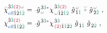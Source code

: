 \begin{subequations} \label{eq:chieff}
\begin{align}
	\textcolor{gray}{\widetilde{\textcolor{black}{\chi}}}^{ \hat{3} \textcolor{PineGreen}{\hat{3}} \textcolor{Maroon}{(2)} \mathcolor{gray}{\omega} }_{ \textcolor{NavyBlue}{\text{eff}} \hat{1} \hat{2} \textcolor{PineGreen}{\hat{1} \hat{2}} } &= \Xint{{}^{}_{\mathcolor{gray}{-}}}{10}{\hat{g}}^{\;\! \hat{3} \textcolor{PineGreen}{\hat{3}} \textcolor{Plum}{*}}_{\;\! \mathcolor{gray}{\omega}} {\chi}^{\;\! \hat{3} \textcolor{PineGreen}{\hat{3}} \textcolor{Maroon}{(2)} }_{\;\! \mathcolor{gray}{\omega} \hat{1} \hat{2} \textcolor{PineGreen}{\hat{1} \hat{2}} } ~ {\hat{g}}^{\;\! \mathcolor{gray}{\omega} }_{\;\! \hat{1} \textcolor{PineGreen}{\hat{1}} } ~\mathcolor{gray}{\widetilde *}~ {\hat{g}}^{\;\! \mathcolor{gray}{\omega} }_{\;\! \hat{2} \textcolor{PineGreen}{\hat{2}} } ~, \label{eq:chieff-spectrum} \\
	{\chi}^{\hat{3} \textcolor{PineGreen}{\hat{3}} \textcolor{Maroon}{(2)} }_{\textcolor{NavyBlue}{\text{eff}} \hat{1} \textcolor{PineGreen}{\hat{1}} \hat{2} \textcolor{PineGreen}{\hat{2}} } &= \Xint{{}^{}_{\mathcolor{gray}{-}}}{10}{\hat{g}}^{\;\! \hat{3} \textcolor{PineGreen}{\hat{3}} \textcolor{Plum}{*}}_{\;\! } {\chi}^{\;\! \hat{3} \textcolor{PineGreen}{\hat{3}} }_{\;\! \textcolor{Maroon}{(2)} \hat{1} \textcolor{PineGreen}{\hat{1}} \hat{2} \textcolor{PineGreen}{\hat{2}}} ~ {\hat{g}}_{\;\! \hat{1} \textcolor{PineGreen}{\hat{1}} } ~ {\hat{g}}_{\;\! \hat{2} \textcolor{PineGreen}{\hat{2}}} ~, \label{eq:chieff-discrete}
\end{align}
\end{subequations}
